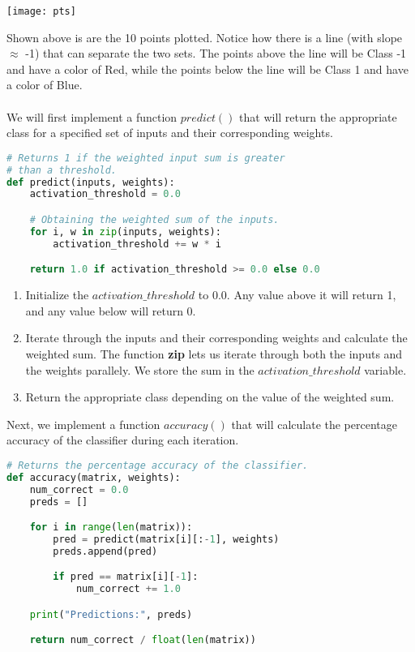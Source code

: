 	\begin{center}
		\texttt{[image: pts]}
	\end{center}
Shown above is are the 10 points plotted. Notice how there is a line (with slope $\approx$ -1) that can separate the two sets. The points above the line will be Class -1 and have a color of Red, while the points below the line will be Class 1 and have a color of Blue. \\ \\
We will first implement a function $predict()$ that will return the appropriate class for a specified set of inputs and their corresponding weights. \\


	\begin{lstlisting}[language=Python, frame=single]
# Returns 1 if the weighted input sum is greater 
# than a threshold.
def predict(inputs, weights):
    activation_threshold = 0.0

    # Obtaining the weighted sum of the inputs.
    for i, w in zip(inputs, weights):
        activation_threshold += w * i

    return 1.0 if activation_threshold >= 0.0 else 0.0
	\end{lstlisting}
	
	\begin{enumerate}
		\item Initialize the $activation\_threshold$ to $0.0$. Any value above it will return 1, and any value below will return 0.
		
		\item Iterate through the inputs and their corresponding weights and calculate the weighted sum. The function \textbf{zip} lets us iterate through both the inputs and the weights parallely. We store the sum in the $activation\_threshold$ variable.
		
		\item Return the appropriate class depending on the value of the weighted sum.
	\end{enumerate}
Next, we implement a function $accuracy()$ that will calculate the percentage accuracy of the classifier during each iteration. \\ 

	\begin{lstlisting}[language=Python, frame=single]
# Returns the percentage accuracy of the classifier.
def accuracy(matrix, weights):
    num_correct = 0.0
    preds = []

    for i in range(len(matrix)):
        pred = predict(matrix[i][:-1], weights)
        preds.append(pred)

        if pred == matrix[i][-1]:
            num_correct += 1.0

    print("Predictions:", preds)

    return num_correct / float(len(matrix))
	\end{lstlisting}
	
